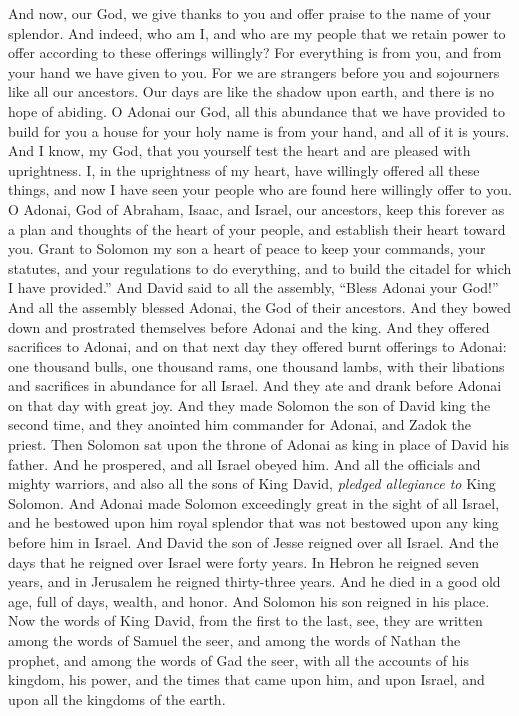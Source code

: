 \begin{biblechapter}
\verse And now, our God, we give thanks to you and offer praise to the name of your splendor.
\verse And indeed, who am I, and who are my people that we retain power to offer according to these offerings willingly? For everything is from you, and from your hand we have given to you.
\verse For we are strangers before you and sojourners like all our ancestors. Our days are like the shadow upon earth, and there is no hope of abiding.
\verse O Adonai our God, all this abundance that we have provided to build for you a house for your holy name is from your hand, and all of it is yours.
\verse And I know, my God, that you yourself test the heart and are pleased with uprightness. I, in the uprightness of my heart, have willingly offered all these things, and now I have seen your people who are found here willingly offer to you.
\verse O Adonai, God of Abraham, Isaac, and Israel, our ancestors, keep this forever as a plan and thoughts of the heart of your people, and establish their heart toward you.
\verse Grant to Solomon my son a heart of peace to keep your commands, your statutes, and your regulations to do everything, and to build the citadel for which I have provided.”
\verse And David said to all the assembly, “Bless Adonai your God!” And all the assembly blessed Adonai, the God of their ancestors. And they bowed down and prostrated themselves before Adonai and the king.
 And they offered sacrifices to Adonai, and on that next day they offered burnt offerings to Adonai: one thousand bulls, one thousand rams, one thousand lambs, with their libations and sacrifices in abundance for all Israel.
\verse And they ate and drank before Adonai on that day with great joy. And they made Solomon the son of David king the second time, and they anointed him commander for Adonai, and Zadok the priest.
\verse Then Solomon sat upon the throne of Adonai as king in place of David his father. And he prospered, and all Israel obeyed him.
\verse And all the officials and mighty warriors, and also all the sons of King David, \textit{pledged allegiance to} King Solomon.
\verse And Adonai made Solomon exceedingly great in the sight of all Israel, and he bestowed upon him royal splendor that was not bestowed upon any king before him in Israel.
 And David the son of Jesse reigned over all Israel.
\verse And the days that he reigned over Israel were forty years. In Hebron he reigned seven years, and in Jerusalem he reigned thirty-three years.
\verse And he died in a good old age, full of days, wealth, and honor. And Solomon his son reigned in his place.
\verse Now the words of King David, from the first to the last, see, they are written among the words of Samuel the seer, and among the words of Nathan the prophet, and among the words of Gad the seer,
\verse with all the accounts of his kingdom, his power, and the times that came upon him, and upon Israel, and upon all the kingdoms of the earth.
\end{biblechapter}

